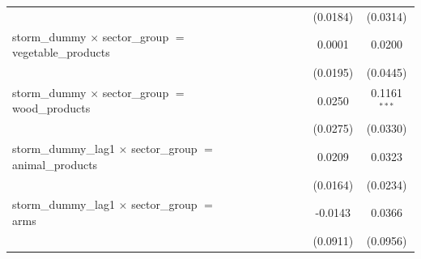\begin{tabular}{lcccccccc}
                                                                                  &                       &                       &                       &                       &                       &                       & (0.0184)              & (0.0314)\\   
   storm\_dummy $\times$ sector\_group $=$ vegetable\_products                    &                       &                       &                       &                       &                       &                       & 0.0001                & 0.0200\\   
                                                                                  &                       &                       &                       &                       &                       &                       & (0.0195)              & (0.0445)\\   
   storm\_dummy $\times$ sector\_group $=$ wood\_products                         &                       &                       &                       &                       &                       &                       & 0.0250                & 0.1161$^{***}$\\   
                                                                                  &                       &                       &                       &                       &                       &                       & (0.0275)              & (0.0330)\\   
   storm\_dummy\_lag1 $\times$ sector\_group $=$ animal\_products                 &                       &                       &                       &                       &                       &                       & 0.0209                & 0.0323\\   
                                                                                  &                       &                       &                       &                       &                       &                       & (0.0164)              & (0.0234)\\   
   storm\_dummy\_lag1 $\times$ sector\_group $=$ arms                             &                       &                       &                       &                       &                       &                       & -0.0143               & 0.0366\\   
                                                                                  &                       &                       &                       &                       &                       &                       & (0.0911)              & (0.0956)\\   

\end{tabular}
